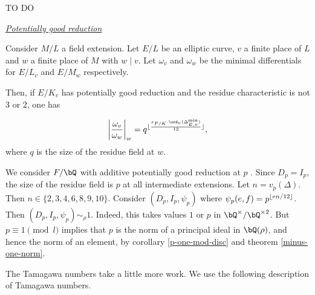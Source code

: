 {\color{red} TO DO}
\vspace{10em}


\noindent\underline{\textit{Potentially good reduction}}

\begin{lemma}
    Consider $M / L$ a field extension. Let $E / L$ be an elliptic curve, $v$ a finite place of $L$ and $w$ a finite place of $M$ with $w \mid v$. Let $\omega_v$ and $\omega_w$ be the minimal differentials for $E / L_v$ and $E / M_w$ respectively. 
    
    Then, if $E / K_v$ has potentially good reduction and the residue characteristic is not $3$ or $2$, one has
    
    \[ \left|\frac{\omega_v}{\omega_w} \right|_{w} = q^{\floor{\frac{e_{F / K} \cdot \ord_v(\Delta_{E, v}^{\min})}{12}}}, \]
    where $q$ is the size of the residue field at $w$.
\end{lemma}

We consider $F / \bQ$ with additive potentially good reduction at $p$ . Since $D_p = I_p$, the size of the residue field is $p$ at all intermediate extensions. Let $n = v_p(\Delta)$. Then $n \in \{2,3,4,6,8,9,10\}$.  Consider $(D_p, I_p, \psi_p)$ where $\psi_p(e,f) = p^{\lfloor e n / 12\rfloor}$. Then $(D_p, I_p, \psi_p) \sim_{\rho} 1$. Indeed, this takes values $1$ or $p$ in $\bQ^{\times} / \bQ^{\times 2}$. But $p \equiv 1 \pmod l$ implies that $p$ is the norm of a principal ideal in $\bQ(\rho)$, and hence the norm of an element, by corollary \ref{p-one-mod-disc} and theorem \ref{minus-one-norm}.

The Tamagawa numbers take a little more work. We use the following description of Tamagawa numbers. %

